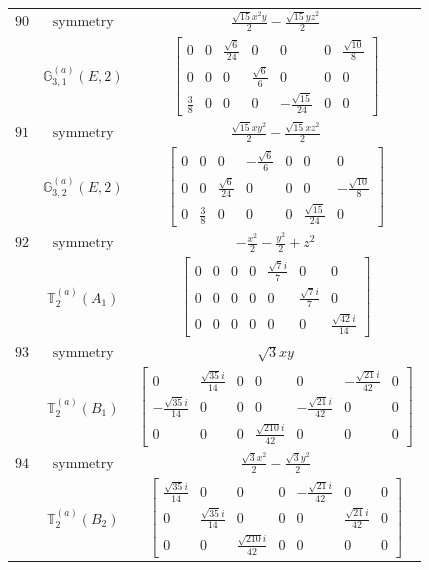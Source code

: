 \documentclass[fleqn,8pt,landscape]{jsarticle}
\begin{document}
\begin{longtable}{ccc}
$ 90 $ & $ \text{symmetry} $ & $ \frac{\sqrt{15} x^{2} y}{2} - \frac{\sqrt{15} y z^{2}}{2} $ \\
$  $ & $ \mathbb{G}_{3,1}^{(a)}(E,2) $ & $ \begin{bmatrix} 0 & 0 & \frac{\sqrt{6}}{24} & 0 & 0 & 0 & \frac{\sqrt{10}}{8} \\ 0 & 0 & 0 & \frac{\sqrt{6}}{6} & 0 & 0 & 0 \\ \frac{3}{8} & 0 & 0 & 0 & - \frac{\sqrt{15}}{24} & 0 & 0 \end{bmatrix} $ \\ \hline
$ 91 $ & $ \text{symmetry} $ & $ \frac{\sqrt{15} x y^{2}}{2} - \frac{\sqrt{15} x z^{2}}{2} $ \\
$  $ & $ \mathbb{G}_{3,2}^{(a)}(E,2) $ & $ \begin{bmatrix} 0 & 0 & 0 & - \frac{\sqrt{6}}{6} & 0 & 0 & 0 \\ 0 & 0 & \frac{\sqrt{6}}{24} & 0 & 0 & 0 & - \frac{\sqrt{10}}{8} \\ 0 & \frac{3}{8} & 0 & 0 & 0 & \frac{\sqrt{15}}{24} & 0 \end{bmatrix} $ \\ \hline
$ 92 $ & $ \text{symmetry} $ & $ - \frac{x^{2}}{2} - \frac{y^{2}}{2} + z^{2} $ \\
$  $ & $ \mathbb{T}_{2}^{(a)}(A_{1}) $ & $ \begin{bmatrix} 0 & 0 & 0 & 0 & \frac{\sqrt{7} i}{7} & 0 & 0 \\ 0 & 0 & 0 & 0 & 0 & \frac{\sqrt{7} i}{7} & 0 \\ 0 & 0 & 0 & 0 & 0 & 0 & \frac{\sqrt{42} i}{14} \end{bmatrix} $ \\ \hline
$ 93 $ & $ \text{symmetry} $ & $ \sqrt{3} x y $ \\
$  $ & $ \mathbb{T}_{2}^{(a)}(B_{1}) $ & $ \begin{bmatrix} 0 & \frac{\sqrt{35} i}{14} & 0 & 0 & 0 & - \frac{\sqrt{21} i}{42} & 0 \\ - \frac{\sqrt{35} i}{14} & 0 & 0 & 0 & - \frac{\sqrt{21} i}{42} & 0 & 0 \\ 0 & 0 & 0 & \frac{\sqrt{210} i}{42} & 0 & 0 & 0 \end{bmatrix} $ \\ \hline
$ 94 $ & $ \text{symmetry} $ & $ \frac{\sqrt{3} x^{2}}{2} - \frac{\sqrt{3} y^{2}}{2} $ \\
$  $ & $ \mathbb{T}_{2}^{(a)}(B_{2}) $ & $ \begin{bmatrix} \frac{\sqrt{35} i}{14} & 0 & 0 & 0 & - \frac{\sqrt{21} i}{42} & 0 & 0 \\ 0 & \frac{\sqrt{35} i}{14} & 0 & 0 & 0 & \frac{\sqrt{21} i}{42} & 0 \\ 0 & 0 & \frac{\sqrt{210} i}{42} & 0 & 0 & 0 & 0 \end{bmatrix} $ \\ \hline

\end{longtable}
\end{document}
